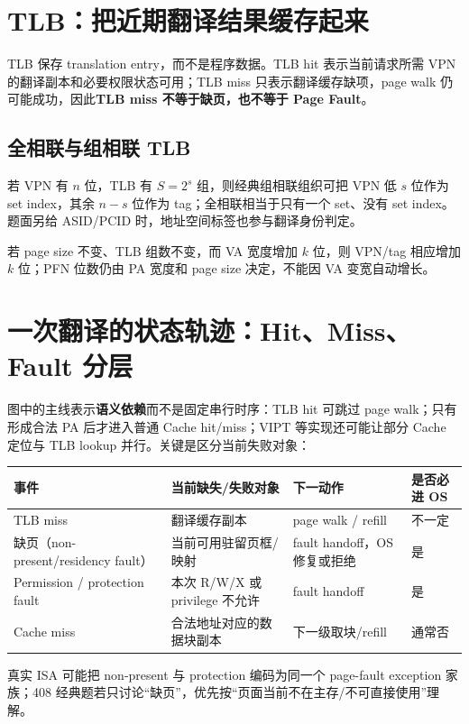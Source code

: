 \documentclass[UTF8,fontset=fandol,11pt,a4paper]{ctexart}
\newcommand{\kw}[1]{\textbf{\color{deep}#1}}\newcommand{\code}[1]{\texttt{#1}}
\begin{document}
\section{TLB：把近期翻译结果缓存起来}
TLB 保存 translation entry，而不是程序数据。TLB hit 表示当前请求所需 VPN 的翻译副本和必要权限状态可用；TLB miss 只表示翻译缓存缺项，page walk 仍可能成功，因此\kw{TLB miss 不等于缺页，也不等于 Page Fault}。

\subsection{全相联与组相联 TLB}
若 VPN 有 $n$ 位，TLB 有 $S=2^s$ 组，则经典组相联组织可把 VPN 低 $s$ 位作为 set index，其余 $n-s$ 位作为 tag；全相联相当于只有一个 set、没有 set index。题面另给 ASID/PCID 时，地址空间标签也参与翻译身份判定。

若 page size 不变、TLB 组数不变，而 VA 宽度增加 $k$ 位，则 VPN/tag 相应增加 $k$ 位；PFN 位数仍由 PA 宽度和 page size 决定，不能因 VA 变宽自动增长。

\section{一次翻译的状态轨迹：Hit、Miss、Fault 分层}
\begin{center}

\end{center}
图中的主线表示\textbf{语义依赖}而不是固定串行时序：TLB hit 可跳过 page walk；只有形成合法 PA 后才进入普通 Cache hit/miss；VIPT 等实现还可能让部分 Cache 定位与 TLB lookup 并行。关键是区分当前失败对象：
\begin{center}\small
\begin{tabularx}{\linewidth}{L{3cm}YY Y}
\toprule
事件 & 当前缺失/失败对象 & 下一动作 & 是否必进 OS\\\midrule
TLB miss & 翻译缓存副本 & page walk / refill & 不一定\\
缺页（non-present/residency fault） & 当前可用驻留页框/映射 & fault handoff，OS 修复或拒绝 & 是\\
Permission / protection fault & 本次 R/W/X 或 privilege 不允许 & fault handoff & 是\\
Cache miss & 合法地址对应的数据块副本 & 下一级取块/refill & 通常否\\
\bottomrule
\end{tabularx}
\end{center}
真实 ISA 可能把 non-present 与 protection 编码为同一个 page-fault exception 家族；408 经典题若只讨论“缺页”，优先按“页面当前不在主存/不可直接使用”理解。
\end{document}
